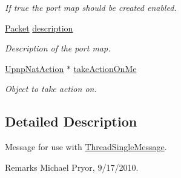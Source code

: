 \begin{DoxyCompactItemize}
\begin{DoxyCompactList}\small\item\em If true the port map should be created enabled. \item\end{DoxyCompactList}\item 
\hyperlink{class_packet}{Packet} \hyperlink{class_thread_message_item_add_port_map_a3e1a5d84d0604a4ef2163dea31755ecb}{description}
\begin{DoxyCompactList}\small\item\em Description of the port map. \item\end{DoxyCompactList}\item 
\hypertarget{class_thread_message_item_add_port_map_ab99dd390021e1aa79acee63084aa7fe7}{
\hyperlink{class_upnp_nat_action}{UpnpNatAction} $\ast$ \hyperlink{class_thread_message_item_add_port_map_ab99dd390021e1aa79acee63084aa7fe7}{takeActionOnMe}}
\label{class_thread_message_item_add_port_map_ab99dd390021e1aa79acee63084aa7fe7}

\begin{DoxyCompactList}\small\item\em Object to take action on. \item\end{DoxyCompactList}\end{DoxyCompactItemize}


\subsection{Detailed Description}
Message for use with \hyperlink{class_thread_single_message}{ThreadSingleMessage}. \begin{DoxyRemark}{Remarks}
Michael Pryor, 9/17/2010. 
\end{DoxyRemark}


